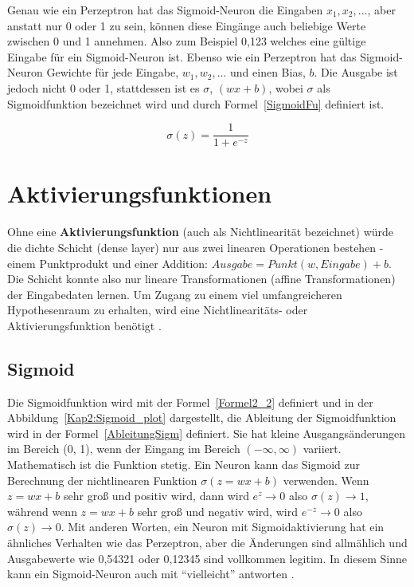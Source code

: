 Genau wie ein Perzeptron hat das Sigmoid-Neuron die Eingaben $x_1, x_2, ...$, aber anstatt nur 0 oder 1 zu sein, können diese Eingänge auch beliebige Werte zwischen 0 und 1 annehmen. Also zum Beispiel 0,123 welches eine gültige Eingabe für ein Sigmoid-Neuron ist. Ebenso wie ein Perzeptron hat das Sigmoid-Neuron Gewichte für jede Eingabe, $w_1, w_2, ...$ und einen Bias, $b$. Die Ausgabe ist jedoch nicht 0 oder 1, stattdessen ist es $\sigma$, $(wx + b)$, wobei $\sigma$ als Sigmoidfunktion bezeichnet wird und durch Formel~\ref{SigmoidFu} definiert ist.

\begin{equation} 
    \sigma (z) = \frac{1}{1+e^{-z}}
\end{equation}
\label{SigmoidFu}


\section{Aktivierungsfunktionen}
Ohne eine \textbf{Aktivierungsfunktion} (auch als Nichtlinearität bezeichnet) würde die dichte Schicht (dense layer) nur aus zwei linearen Operationen bestehen - einem Punktprodukt und einer Addition: $Ausgabe = Punkt (w, Eingabe) + b$. Die Schicht konnte also nur lineare Transformationen (affine Transformationen) der Eingabedaten lernen. Um Zugang zu einem viel umfangreicheren Hypothesenraum zu erhalten, wird eine Nichtlinearitäts- oder Aktivierungsfunktion benötigt \cite*[S. 72]{Chollet2017}.

\subsection{Sigmoid}
Die Sigmoidfunktion wird mit der Formel~\ref{Formel2_2} definiert und in der Abbildung~\ref{Kap2:Sigmoid_plot} dargestellt, die Ableitung der Sigmoidfunktion wird in der Formel~\ref{AbleitungSigm} definiert. Sie hat kleine Ausgangsänderungen im Bereich (0, 1), wenn der Eingang im Bereich $(-\infty, \infty)$ variiert. Mathematisch ist die Funktion stetig. Ein Neuron kann das Sigmoid zur Berechnung der nichtlinearen Funktion $\sigma(z = wx + b)$ verwenden. Wenn $z = wx + b$ sehr groß und positiv wird, dann wird $e^z \rightarrow 0$ also $\sigma(z) \rightarrow 1$, während wenn $z = wx + b$ sehr groß und negativ wird, wird $e^{-z} \rightarrow 0$ also $\sigma(z) \rightarrow 0$. Mit anderen Worten, ein Neuron mit Sigmoidaktivierung hat ein ähnliches Verhalten wie das Perzeptron, aber die Änderungen sind allmählich und Ausgabewerte wie 0,54321 oder 0,12345 sind vollkommen legitim. In diesem Sinne kann ein Sigmoid-Neuron auch mit \enquote{vielleicht} antworten \cite*[10]{AntonioGuili;AmitaKapoor;SujitPal2019}.

